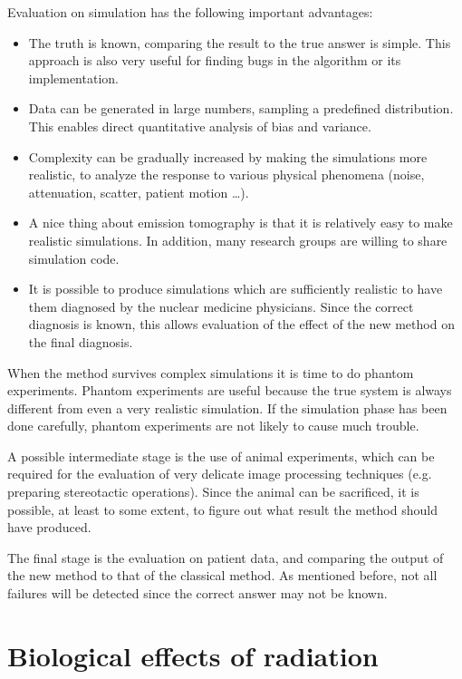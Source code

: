 \documentclass[11pt,oneside]{book}
\begin{document}
Evaluation on simulation has the following important advantages:
\begin{itemize}
  \item The truth is known, comparing the result to the true answer is simple.
        This approach is also very useful for finding bugs in the algorithm or
        its implementation.
  \item Data can be generated in large numbers, sampling a predefined
        distribution. This enables direct quantitative analysis of bias and
        variance.
  \item Complexity can be gradually increased by making the simulations more
        realistic, to analyze the response to various physical phenomena
        (noise, attenuation, scatter, patient motion \ldots).
  \item A nice thing about emission tomography is that it is relatively easy
        to make realistic simulations. In addition, many research groups are
        willing to share simulation code.
  \item It is possible to produce simulations which are sufficiently realistic
        to have them diagnosed by the nuclear medicine physicians. Since the
        correct diagnosis is known, this allows evaluation of the effect of
        the new method on the final diagnosis.
\end{itemize}

When the method survives complex simulations it is time to do phantom
experiments. Phantom experiments are useful because the true system is always
different from even a very realistic simulation. If the simulation phase has
been done carefully, phantom experiments are not likely to cause much trouble.

A possible intermediate stage is the use of animal experiments, which can be
required for the evaluation of very delicate image processing techniques
(e.g. preparing stereotactic operations). Since the animal can be sacrificed,
it is possible, at least to some extent, to figure out what result the method
should have produced.

The final stage is the evaluation on patient data, and comparing the output of
the new method to that of the classical method. As mentioned before, not all
failures will be detected since the correct answer may not be known.

\chapter{Biological effects of radiation} \label{chap:biol}
\end{document}
